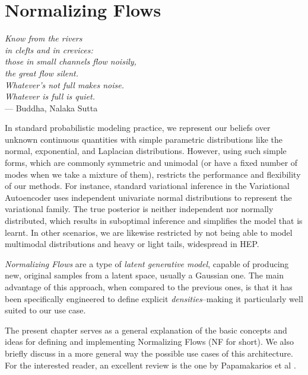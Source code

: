 \chapter{Normalizing Flows}\label{ch:mathtest} %
\begin{flushright}{\slshape
    Know from the rivers \\
    in clefts and in crevices: \\
    those in small channels flow noisily, \\
    the great flow silent. \\
    Whatever’s not full makes noise.\\
    Whatever is full is quiet. } \\ \medskip
    --- Buddha, Nalaka Sutta
\end{flushright}

In standard probabilistic modeling practice, we represent our beliefs over unknown continuous quantities with simple parametric distributions like the normal, exponential, and Laplacian distributions. However, using such simple forms, which are commonly symmetric and unimodal (or have a fixed number of modes when we take a mixture of them), restricts the performance and flexibility of our methods. For instance, standard variational inference in the Variational Autoencoder uses independent univariate normal distributions to represent the variational family. The true posterior is neither independent nor normally distributed, which results in suboptimal inference and simplifies the model that is learnt. In other scenarios, we are likewise restricted by not being able to model multimodal distributions and heavy or light tails, widespread in HEP.

\emph{Normalizing Flows} are a type of \emph{latent generative model}, capable of producing new, original samples from a latent space, usually a Gaussian one. The main advantage of this approach, when compared to the previous ones, is that it has been specifically engineered to define explicit \emph{densities}--making it particularly well suited to our use case.

The present chapter serves as a general explanation of the basic concepts and ideas for defining and implementing Normalizing Flows (NF for short). We also briefly discuss in a more general way the possible use cases of this architecture. For the interested reader, an excellent review is the one by Papamakarios et al \cite{papanf}.

